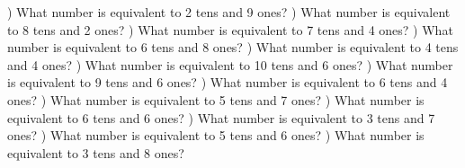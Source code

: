\documentclass{article}%
\begin{document}
) What number is equivalent to 2 tens and 9 ones?%
\newline%
\newline%
) What number is equivalent to 8 tens and 2 ones?%
\newline%
\newline%
) What number is equivalent to 7 tens and 4 ones?%
\newline%
\newline%
) What number is equivalent to 6 tens and 8 ones?%
\newline%
\newline%
) What number is equivalent to 4 tens and 4 ones?%
\newline%
\newline%
) What number is equivalent to 10 tens and 6 ones?%
\newline%
\newline%
) What number is equivalent to 9 tens and 6 ones?%
\newline%
\newline%
) What number is equivalent to 6 tens and 4 ones?%
\newline%
\newline%
) What number is equivalent to 5 tens and 7 ones?%
\newline%
\newline%
) What number is equivalent to 6 tens and 6 ones?%
\newline%
\newline%
) What number is equivalent to 3 tens and 7 ones?%
\newline%
\newline%
) What number is equivalent to 5 tens and 6 ones?%
\newline%
\newline%
) What number is equivalent to 3 tens and 8 ones?%
\newline%
\newline%
\end{document}
